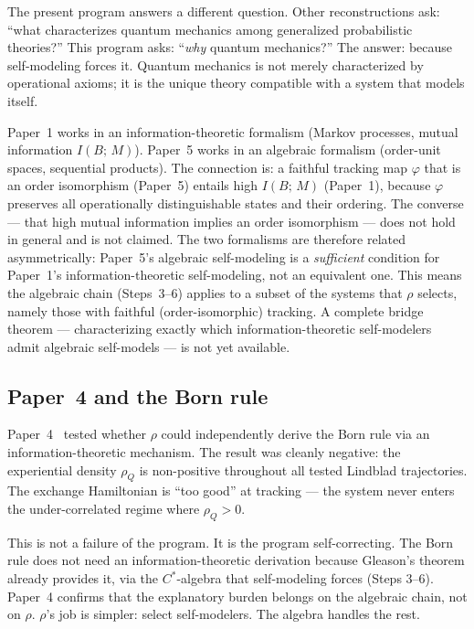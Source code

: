 The present program answers a different question.  Other
reconstructions ask: ``what characterizes quantum mechanics among
generalized probabilistic theories?''  This program asks: ``\emph{why}
quantum mechanics?''  The answer: because self-modeling forces it.
Quantum mechanics is not merely characterized by operational axioms; it
is the unique theory compatible with a system that models itself.

\begin{remark}
\label{rem:two-formalisms}
Paper~1 works in an information-theoretic formalism (Markov processes,
mutual information $I(B;\,M)$).  Paper~5 works in an algebraic formalism
(order-unit spaces, sequential products).  The connection is: a faithful
tracking map $\varphi$ that is an order isomorphism (Paper~5) entails
high $I(B;\,M)$ (Paper~1), because $\varphi$ preserves all operationally
distinguishable states and their ordering.  The converse --- that high
mutual information implies an order isomorphism --- does not hold in
general and is not claimed.  The two formalisms are therefore related
asymmetrically: Paper~5's algebraic self-modeling is a \emph{sufficient}
condition for Paper~1's information-theoretic self-modeling, not an
equivalent one.  This means the algebraic chain (Steps~3--6) applies to
a subset of the systems that $\rho$ selects, namely those with faithful
(order-isomorphic) tracking.  A complete bridge theorem --- characterizing
exactly which information-theoretic self-modelers admit algebraic
self-models --- is not yet available.
\end{remark}

\subsection{Paper~4 and the Born rule}
\label{subsec:born}

Paper~4~\citep{ehrlich2026born} tested whether $\rho$ could
independently derive the Born rule via an information-theoretic
mechanism.  The result was cleanly negative: the experiential density
$\rho_Q$ is non-positive throughout all tested Lindblad trajectories.
The exchange Hamiltonian is ``too good'' at tracking --- the system
never enters the under-correlated regime where $\rho_Q > 0$.

This is not a failure of the program.  It is the program
self-correcting.  The Born rule does not need an information-theoretic
derivation because Gleason's theorem already provides it, via the
$C^*$-algebra that self-modeling forces (Steps 3--6).  Paper~4
confirms that the explanatory burden belongs on the algebraic chain,
not on $\rho$.  $\rho$'s job is simpler: select self-modelers.  The
algebra handles the rest.
